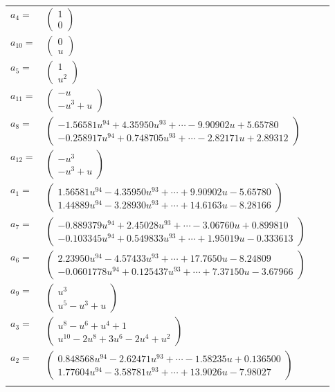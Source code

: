\documentclass[1p]{elsarticle_modified}
\theoremstyle{definition}
\begin{document}
\begin{tabular}{m{7pt} m{180pt} m{7pt} m{180pt} }
\flushright $a_{4}=$&$\begin{pmatrix}1\\0\end{pmatrix}$ \\
\flushright $a_{10}=$&$\begin{pmatrix}0\\u\end{pmatrix}$ \\
\flushright $a_{5}=$&$\begin{pmatrix}1\\u^2\end{pmatrix}$ \\
\flushright $a_{11}=$&$\begin{pmatrix}- u\\- u^3+u\end{pmatrix}$ \\
\flushright $a_{8}=$&$\begin{pmatrix}-1.56581 u^{94}+4.35950 u^{93}+\cdots-9.90902 u+5.65780\\-0.258917 u^{94}+0.748705 u^{93}+\cdots-2.82171 u+2.89312\end{pmatrix}$ \\
\flushright $a_{12}=$&$\begin{pmatrix}- u^3\\- u^3+u\end{pmatrix}$ \\
\flushright $a_{1}=$&$\begin{pmatrix}1.56581 u^{94}-4.35950 u^{93}+\cdots+9.90902 u-5.65780\\1.44889 u^{94}-3.28930 u^{93}+\cdots+14.6163 u-8.28166\end{pmatrix}$ \\
\flushright $a_{7}=$&$\begin{pmatrix}-0.889379 u^{94}+2.45028 u^{93}+\cdots-3.06760 u+0.899810\\-0.103345 u^{94}+0.549833 u^{93}+\cdots+1.95019 u-0.333613\end{pmatrix}$ \\
\flushright $a_{6}=$&$\begin{pmatrix}2.23950 u^{94}-4.57433 u^{93}+\cdots+17.7650 u-8.24809\\-0.0601778 u^{94}+0.125437 u^{93}+\cdots+7.37150 u-3.67966\end{pmatrix}$ \\
\flushright $a_{9}=$&$\begin{pmatrix}u^3\\u^5- u^3+u\end{pmatrix}$ \\
\flushright $a_{3}=$&$\begin{pmatrix}u^8- u^6+u^4+1\\u^{10}-2 u^8+3 u^6-2 u^4+u^2\end{pmatrix}$ \\
\flushright $a_{2}=$&$\begin{pmatrix}0.848568 u^{94}-2.62471 u^{93}+\cdots-1.58235 u+0.136500\\1.77604 u^{94}-3.58781 u^{93}+\cdots+13.9026 u-7.98027\end{pmatrix}$\\&\end{tabular}
\end{document}
